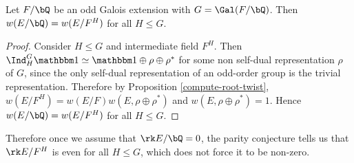 \begin{lemma}
 Let $F / \bQ$ be an odd Galois extension with $G = \Gal(F / \bQ)$. Then $w(E / \bQ) = w(E / F^H)$ for all $H \leq G$. 
\end{lemma}

\begin{proof}
Consider $H \leq G$ and intermediate field $F^H$. Then 
$\Ind_H^G \trivial \simeq \trivial \oplus 
\rho \oplus \rho^*$ for some non self-dual representation $\rho$ of $G$, since the only self-dual representation of an odd-order group is the trivial representation. Therefore by Proposition \ref{compute-root-twist}, $w(E / F^H) = w(E / F)w(E, \rho \oplus \rho^*)$ and $w(E, \rho \oplus \rho^*) = 1$. Hence $w(E / \bQ) = w(E / F^H)$ for all $H \leq G$. 
\end{proof}

Therefore once we assume that $\rk E / \bQ = 0$, the parity conjecture tells us that $\rk E / F^H$ is even for all $H \leq G$, which does not force it to be non-zero. 

